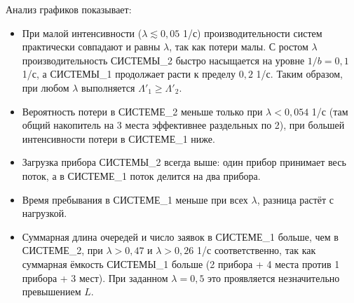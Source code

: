Анализ графиков показывает:
\begin{itemize}
\item При малой интенсивности ($\lambda \lesssim 0{,}05$ 1/с) производительности систем практически совпадают
и равны $\lambda$, так как потери малы. С ростом $\lambda$ производительность СИСТЕМЫ\_2 быстро
насыщается на уровне $1/b = 0{,}1$ 1/с, а СИСТЕМЫ\_1 продолжает расти к пределу $0{,}2$ 1/с.
Таким образом, при любом $\lambda$ выполняется $\Lambda'_1 \ge \Lambda'_2$.
\item Вероятность потери в СИСТЕМЕ\_2 меньше только при $\lambda < 0{,}054$ 1/с (там общий накопитель на 3 места
эффективнее раздельных по 2), при большей интенсивности потери в СИСТЕМЕ\_1 ниже.
\item Загрузка прибора СИСТЕМЫ\_2 всегда выше: один прибор принимает весь поток, а в СИСТЕМЕ\_1
поток делится на два прибора.
\item Время пребывания в СИСТЕМЕ\_1 меньше при всех $\lambda$, разница растёт с нагрузкой.
\item Суммарная длина очередей и число заявок в СИСТЕМЕ\_1 больше, чем в СИСТЕМЕ\_2, при
$\lambda > 0{,}47$ и $\lambda > 0{,}26$ 1/с соответственно, так как суммарная ёмкость СИСТЕМЫ\_1 больше
(2 прибора + 4 места против 1 прибора + 3 мест). При заданном $\lambda=0{,}5$ это проявляется
незначительно превышением $L$.
\end{itemize}
